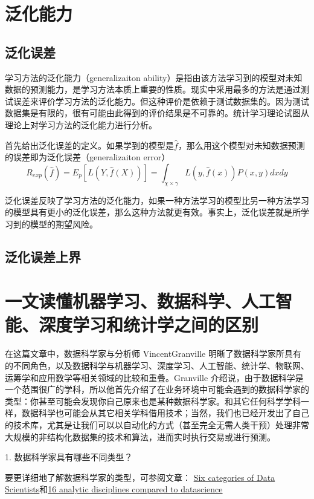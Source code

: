 \documentclass[10pt,a4paper]{ctexbook}
\begin{document}
\section{泛化能力}
\subsection{泛化误差}
学习方法的泛化能力（generalizaiton ability）是指由该方法学习到的模型对未知数据的预测能力，是学习方法本质上重要的性质。现实中采用最多的方法是通过测试误差来评价学习方法的泛化能力。但这种评价是依赖于测试数据集的。因为测试数据集是有限的，很有可能由此得到的评价结果是不可靠的。统计学习理论试图从理论上对学习方法的泛化能力进行分析。

首先给出泛化误差的定义。如果学到的模型是$\hat{f}$，那么用这个模型对未知数据预测的误差即为泛化误差（generalizaiton error）
\[
R_{exp}(\hat{f})=E_{p}[L(Y, \hat{f}(X))]=\int_{\chi\times\gamma}{L(y,\hat{f}(x))P(x,y)dxdy}
\]

泛化误差反映了学习方法的泛化能力，如果一种方法学习的模型比另一种方法学习的模型具有更小的泛化误差，那么这种方法就更有效。事实上，泛化误差就是所学习到的模型的期望风险。

\subsection{泛化误差上界}



\section{一文读懂机器学习、数据科学、人工智能、深度学习和统计学之间的区别}

在这篇文章中，数据科学家与分析师 VincentGranville 明晰了数据科学家所具有的不同角色，以及数据科学与机器学习、深度学习、人工智能、统计学、物联网、运筹学和应用数学等相关领域的比较和重叠。Granville 介绍说，由于数据科学是一个范围很广的学科，所以他首先介绍了在业务环境中可能会遇到的数据科学家的类型：你甚至可能会发现你自己原来也是某种数据科学家。和其它任何科学学科一样，数据科学也可能会从其它相关学科借用技术；当然，我们也已经开发出了自己的技术库，尤其是让我们可以以自动化的方式（甚至完全无需人类干预）处理非常大规模的非结构化数据集的技术和算法，进而实时执行交易或进行预测。

1. 数据科学家具有哪些不同类型？

要更详细地了解数据科学家的类型，可参阅文章： \href{http://suo.im/28rlX1}{Six categories of Data Scientists}和\href{http://suo.im/3NNUpd}{16 analytic disciplines compared to datascience}
\end{document}
